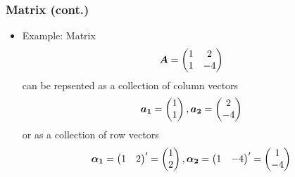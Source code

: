 \documentclass[pdflatex, 12pt]{beamer}
\begin{document}
\begin{frame}
\frametitle{Matrix (cont.)}
\begin{itemize}
\item Example: Matrix
 \begin{equation}
 \bm{A} = \begin{pmatrix}
 1 & 2 \\
 1 & -4 \\
 \end{pmatrix} \notag
 \end{equation}
can be repsented as a collection of column vectors
 \begin{equation}
 \bm{a_1} = \begin{pmatrix}
 1 \\
 1 \\
 \end{pmatrix}, \bm{a_2} = \begin{pmatrix}
 2 \\
 -4 \\
 \end{pmatrix} \notag
 \end{equation}
or as a collection of row vectors
 \begin{equation}
 \bm{\alpha_1} = \begin{pmatrix}
 1 & 2 \\
 \end{pmatrix}' = \begin{pmatrix}
 1 \\
 2 \\
 \end{pmatrix}, \bm{\alpha_2} = \begin{pmatrix}
 1 & -4 \\
 \end{pmatrix}' = \begin{pmatrix}
 1 \\
 -4 \\
 \end{pmatrix} \notag
 \end{equation}
\end{itemize}
\end{frame}
\end{document}
